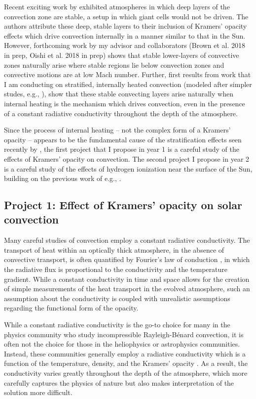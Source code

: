 \documentclass[aasms,12pt]{article}
\newcommand{\RB}{Rayleigh-B\'{e}nard }
\begin{document}
Recent exciting work by \cite{kapyla&all2017}
exhibited atmospheres in which deep layers of the convection
zone are stable, a setup in which giant cells would not be driven.  
The authors attribute these deep, stable layers to their inclusion of Kramers' opacity
effects which drive convection internally in a manner similar to that in the Sun.  
However, forthcoming work by my advisor and collaborators (Brown et al. 2018 in prep, Oishi et al. 2018 in prep) 
shows that 
stable lower-layers of convective zones naturally arise where stable regions lie below convection
zones and convective motions are at low Mach number.
Further, first results from work that I am conducting on stratified, internally
heated convection (modeled after simpler studes, e.g., \cite{goluskin&spiegel2012}),
show that these stable convecting layers arise naturally when internal heating is the mechanism which
drives convection, even in the presence of a constant radiative conductivity throughout the depth of the atmosphere.

Since the process of internal heating -- not the complex form of a Kramers' opacity --
appears to be the fundamental cause of the stratification effects seen recently by \cite{kapyla&all2017},
the first project that I propose in year 1 is a careful study of the effects of Kramers' opacity on convection.
The second project I propose in year 2 is a careful study of the effects of hydrogen ionization near the surface
of the Sun, building on the previous work of e.g., \cite{rast&toomre1993}.

\vspace{-0.25cm}
\subsection{Project 1: Effect of Kramers' opacity on solar convection}
\vspace{-0.15cm}
Many careful studies of convection employ a constant radiative conductivity.
The transport of heat within an optically thick atmosphere, in the absence of convective transport,
is often quantified by Fourier's law of conduction \citep{lecoanet&all2014}, in which the radiative
flux is proportional to the conductivity and the temperature gradient.  
While a constant conductivity in time and space allows for the creation of simple measurements of the
heat transport in the evolved atmosphere, such an assumption about
the conductivity is coupled with unrealistic assumptions regarding the functional form of the opacity.  

While a constant radiative
conductivity is the go-to choice for many in the physics community who study incompressible
\RB convection, it is often not the choice for those in the heliophysics or astrophysics
communities.  Instead, these communities generally employ a radiative conductivity which is a function
of the temperature, density, and the Kramers' opacity \citep{barekat&brandenburg2014, brandenburg2016, kapyla&all2017}.
As a result, the conductivity varies greatly throughout the depth of the atmosphere, which 
more carefully captures the physics of nature but also makes interpretation of the solution 
more difficult.
\end{document}
